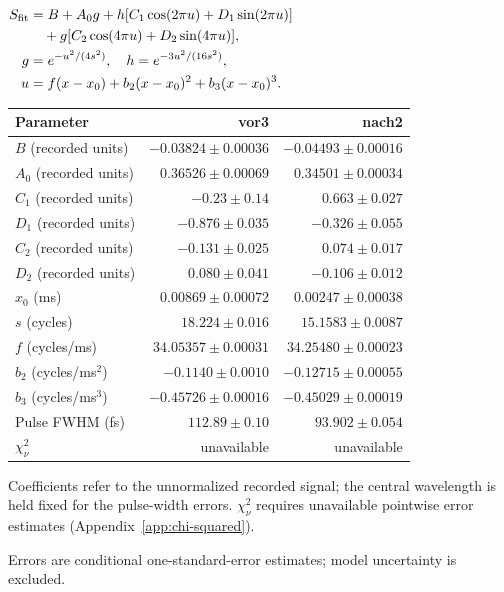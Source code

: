 \par\smallskip\begingroup\small
\setlength{\tabcolsep}{5pt}
\(\begin{aligned}S_{\rm fit}&=B+A_0g+h[C_1\cos(2\pi u)+D_1\sin(2\pi u)]\\&\quad+g[C_2\cos(4\pi u)+D_2\sin(4\pi u)],\\g&=e^{-u^2/(4s^2)},\quad h=e^{-3u^2/(16s^2)},\\u&=f(x-x_0)+b_2(x-x_0)^2+b_3(x-x_0)^3.\end{aligned}\)
\par\smallskip\begin{tabular}{lrr}\toprule
Parameter & vor3 & nach2\\\midrule
$B$ (recorded units) & $-0.03824\pm0.00036$ & $-0.04493\pm0.00016$\\
$A_0$ (recorded units) & $0.36526\pm0.00069$ & $0.34501\pm0.00034$\\
$C_1$ (recorded units) & $-0.23\pm0.14$ & $0.663\pm0.027$\\
$D_1$ (recorded units) & $-0.876\pm0.035$ & $-0.326\pm0.055$\\
$C_2$ (recorded units) & $-0.131\pm0.025$ & $0.074\pm0.017$\\
$D_2$ (recorded units) & $0.080\pm0.041$ & $-0.106\pm0.012$\\
$x_0$ (ms) & $0.00869\pm0.00072$ & $0.00247\pm0.00038$\\
$s$ (cycles) & $18.224\pm0.016$ & $15.1583\pm0.0087$\\
$f$ (cycles/ms) & $34.05357\pm0.00031$ & $34.25480\pm0.00023$\\
$b_2$ (cycles/ms$^2$) & $-0.1140\pm0.0010$ & $-0.12715\pm0.00055$\\
$b_3$ (cycles/ms$^3$) & $-0.45726\pm0.00016$ & $-0.45029\pm0.00019$\\
Pulse FWHM (fs) & $112.89\pm0.10$ & $93.902\pm0.054$\\
$\chi^2_\nu$ & unavailable & unavailable\\
\bottomrule\end{tabular}
\par\smallskip\noindent Coefficients refer to the unnormalized recorded signal; the central wavelength is held fixed for the pulse-width errors. $\chi^2_\nu$ requires unavailable pointwise error estimates (Appendix~\ref{app:chi-squared}).
\par\smallskip\noindent Errors are conditional one-standard-error estimates; model uncertainty is excluded.
\par\endgroup

